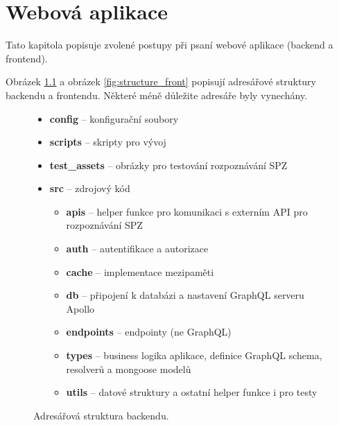 
\chapter{Webová aplikace}

\noindent
Tato kapitola popisuje zvolené postupy při psaní webové aplikace (backend a frontend).

Obrázek \ref{fig:structure_back} a obrázek \ref{fig:structure_front} popisují adresářové
struktury backendu a frontendu.
Některé méně důležite adresáře byly vynechány.

\begin{figure} [!htb]
  \begin{itemize}
    \setlength\itemsep{.05em}
    \item \textbf{config} -- konfigurační soubory
    \item \textbf{scripts} -- skripty pro vývoj
    \item \textbf{test\_assets} -- obrázky pro testování rozpoznávání SPZ
    \item \textbf{src} -- zdrojový kód
    \begin{itemize}
      \setlength\itemsep{.05em}
      \item \textbf{apis} -- helper funkce pro komunikaci s externím API pro rozpoznávání SPZ
      \item \textbf{auth} -- autentifikace a autorizace
      \item \textbf{cache} -- implementace mezipaměti
      \item \textbf{db} -- připojení k databázi a nastavení GraphQL serveru Apollo
      \item \textbf{endpoints} -- endpointy (ne GraphQL)
      \item \textbf{types} -- business logika aplikace, definice GraphQL schema, resolverů a mongoose modelů
      \item \textbf{utils} -- datové struktury a ostatní helper funkce i pro testy
    \end{itemize}
  \end{itemize}
  \caption{Adresářová struktura backendu.}
  \label{fig:structure_back}
  \end{figure}
  
